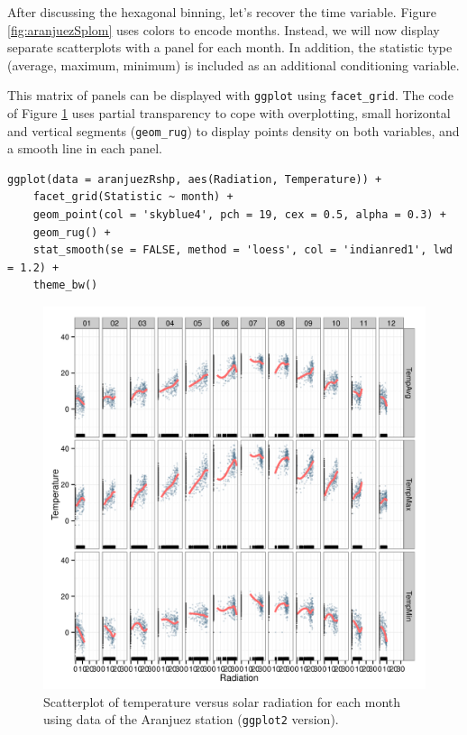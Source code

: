 After discussing the hexagonal binning, let's recover the time
variable. Figure \ref{fig:aranjuezSplom} uses colors to encode
months. Instead, we will now display separate scatterplots with a
panel for each month. In addition, the statistic type (average,
maximum, minimum) is included as an additional conditioning variable.

This matrix of panels can be displayed with \texttt{ggplot} using
\texttt{facet\_grid}. The code of Figure \ref{fig:aranjuezFacetGrid} uses partial
transparency to cope with overplotting, small horizontal and vertical
segments (\texttt{geom\_rug}) to display points density on both variables, and
a smooth line in each panel.
\lstset{language=r,label= ,caption= ,captionpos=b,numbers=none}
\begin{lstlisting}
ggplot(data = aranjuezRshp, aes(Radiation, Temperature)) +
    facet_grid(Statistic ~ month) +
    geom_point(col = 'skyblue4', pch = 19, cex = 0.5, alpha = 0.3) +
    geom_rug() +
    stat_smooth(se = FALSE, method = 'loess', col = 'indianred1', lwd = 1.2) +
    theme_bw()
\end{lstlisting}

\begin{figure}[htbp]
\centering
\includegraphics[width=.9\linewidth]{figs/aranjuezFacetGrid.png}
\caption{Scatterplot of temperature versus solar radiation for each month using data of the Aranjuez station (\texttt{ggplot2} version). \label{fig:aranjuezFacetGrid}}
\end{figure}

